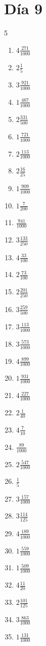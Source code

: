 \documentclass[12pt]{article}
\begin{document}
\section*{Día 9}
\begin{multicols}{5}\begin{enumerate}
\item $ 4 \frac{271}{1000} $
\item $ 2 \frac{1}{5} $
\item $ 3 \frac{921}{1000} $
\item $ 1 \frac{467}{1000} $
\item $ 2 \frac{331}{500} $
\item $ 1 \frac{721}{1000} $
\item $ 2 \frac{113}{1000} $
\item $ 2 \frac{16}{25} $
\item $ 1 \frac{909}{1000} $
\item $ 1 \frac{7}{200} $
\item $ \frac{941}{1000} $
\item $ 3 \frac{133}{250} $
\item $ 4 \frac{33}{100} $
\item $ 2 \frac{73}{100} $
\item $ 2 \frac{201}{250} $
\item $ 3 \frac{259}{500} $
\item $ 3 \frac{113}{1000} $
\item $ 3 \frac{573}{1000} $
\item $ 4 \frac{899}{1000} $
\item $ 1 \frac{931}{1000} $
\item $ 4 \frac{227}{1000} $
\item $ 2 \frac{1}{40} $
\item $ 4 \frac{7}{10} $
\item $ \frac{89}{1000} $
\item $ 2 \frac{547}{1000} $
\item $ \frac{1}{5} $
\item $ 3 \frac{157}{1000} $
\item $ 3 \frac{114}{125} $
\item $ 4 \frac{189}{1000} $
\item $ 1 \frac{559}{1000} $
\item $ 1 \frac{509}{1000} $
\item $ 4 \frac{11}{20} $
\item $ 2 \frac{101}{125} $
\item $ 3 \frac{863}{1000} $
\item $ 1 \frac{131}{1000} $

\end{enumerate}
\end{multicols}
\end{document}
